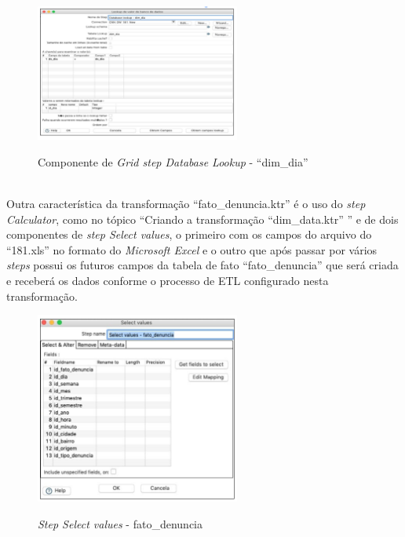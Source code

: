 \begin{figure}[H]
	\vspace*{0,2cm}
    \centering
    \caption{Componente de \textit{Grid step Database Lookup} - ``dim\_dia''}
    \includegraphics[width=0.6\textwidth]{./04-figuras/figura-step-dl-dim-dia}
    \label{fig:ilustfigstepdldimdia}
\end{figure}
\vspace*{-0,9cm}
{\raggedright {}} \\

Outra caracter\'{i}stica da transforma\c{c}\~{a}o ``fato\_denuncia.ktr'' \'{e} o uso do \textit{step Calculator}, como no 
t\'{o}pico ``Criando a transforma\c{c}\~{a}o ``dim\_data.ktr'' '' e  de dois componentes de \textit{step Select values}, o primeiro com os 
campos do arquivo do ``181.xls'' no formato do \textit{Microsoft Excel} e o outro que ap\'{o}s passar por v\'{a}rios \textit{steps} possui 
os futuros campos da tabela de fato ``fato\_denuncia'' que ser\'{a} criada e receber\'{a} os dados conforme o processo de ETL configurado nesta transforma\c{c}\~{a}o.

\begin{figure}[H]
	\vspace*{0,2cm}
    \centering
    \caption{\textit{Step Select values} - fato\_denuncia}
    \includegraphics[width=0.6\textwidth]{./04-figuras/figura-step-sv-fato-denuncia}
    \label{fig:ilustfigstepsvfatodenuncia}
\end{figure}
\vspace*{-0,9cm}
{\raggedright {}} \\


